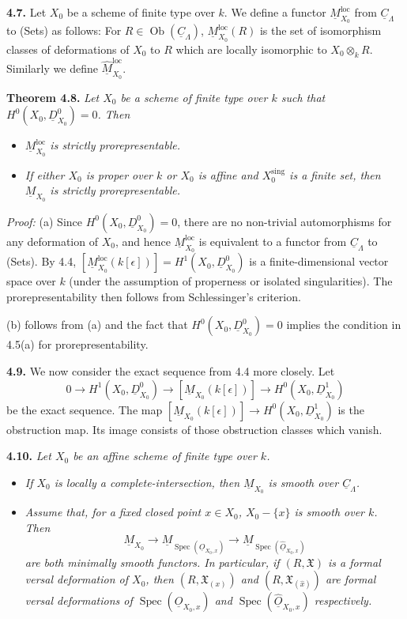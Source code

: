 \documentclass[11pt]{article}
\theoremstyle{plain}
\theoremstyle{definition}
\theoremstyle{remark}
\DeclareMathOperator{\Spec}{Spec}
\DeclareMathOperator{\ob}{Ob}
\begin{document}
\medskip
\noindent\textbf{4.7.} Let $X_0$ be a scheme of finite type over $k$. We define a functor $\underline{M}_{X_0}^{\mathrm{loc}}$ from $\underline{C}_\Lambda$ to (Sets) as follows: For $R \in \ob(\underline{C}_\Lambda)$, $\underline{M}_{X_0}^{\mathrm{loc}}(R)$ is the set of isomorphism classes of deformations of $X_0$ to $R$ which are locally isomorphic to $X_0 \otimes_k R$. Similarly we define $\widehat{\underline{M}}_{X_0}^{\mathrm{loc}}$.

\medskip
\noindent\textbf{Theorem 4.8.} \textit{Let $X_0$ be a scheme of finite type over $k$ such that $H^0(X_0, \underline{D}_{X_0}^0) = 0$. Then}
\begin{itemize}
\item[(a)] \textit{$\underline{M}_{X_0}^{\mathrm{loc}}$ is strictly prorepresentable.}
\item[(b)] \textit{If either $X_0$ is proper over $k$ or $X_0$ is affine and $X_0^{\mathrm{sing}}$ is a finite set, then $\underline{M}_{X_0}$ is strictly prorepresentable.}
\end{itemize}

\medskip
\noindent\textit{Proof:} (a) Since $H^0(X_0, \underline{D}_{X_0}^0) = 0$, there are no non-trivial automorphisms for any deformation of $X_0$, and hence $\underline{M}_{X_0}^{\mathrm{loc}}$ is equivalent to a functor from $\underline{C}_\Lambda$ to (Sets). By 4.4, $[\underline{M}_{X_0}^{\mathrm{loc}}(k[\epsilon])] = H^1(X_0, \underline{D}_{X_0}^0)$ is a finite-dimensional vector space over $k$ (under the assumption of properness or isolated singularities). The prorepresentability then follows from Schlessinger's criterion.

(b) follows from (a) and the fact that $H^0(X_0, \underline{D}_{X_0}^0) = 0$ implies the condition in 4.5(a) for prorepresentability.

\medskip
\noindent\textbf{4.9.} We now consider the exact sequence from 4.4 more closely. Let
\[0 \to H^1(X_0, \underline{D}_{X_0}^0) \to [\underline{M}_{X_0}(k[\epsilon])] \to H^0(X_0, \underline{D}_{X_0}^1)\]
be the exact sequence. The map $[\underline{M}_{X_0}(k[\epsilon])] \to H^0(X_0, \underline{D}_{X_0}^1)$ is the obstruction map. Its image consists of those obstruction classes which vanish.

\medskip
\noindent\textbf{4.10.} \textit{Let $X_0$ be an affine scheme of finite type over $k$.}
\begin{itemize}
\item[(a)] \textit{If $X_0$ is locally a complete-intersection, then $\underline{M}_{X_0}$ is smooth over $\underline{C}_\Lambda$.}
\item[(b)] \textit{Assume that, for a fixed closed point $x \in X_0$, $X_0 - \{x\}$ is smooth over $k$. Then}
\[\underline{M}_{X_0} \to \underline{M}_{\Spec(\underline{O}_{X_0,x})} \to \underline{M}_{\Spec(\widehat{\underline{O}}_{X_0,x})}\]
\textit{are both minimally smooth functors. In particular, if $(R, \mathfrak{X})$ is a formal versal deformation of $X_0$, then $(R, \mathfrak{X}_{(x)})$ and $(R, \mathfrak{X}_{(\widehat{x})})$ are formal versal deformations of $\Spec(\underline{O}_{X_0,x})$ and $\Spec(\widehat{\underline{O}}_{X_0,x})$ respectively.}
\end{itemize}
\end{document}
